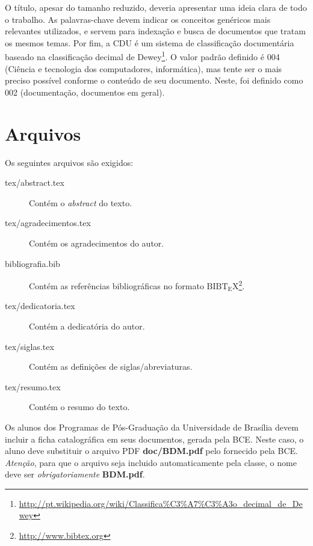 O título, apesar do tamanho reduzido, deveria apresentar uma ideia clara de todo
o trabalho. As palavras-chave devem indicar os conceitos genéricos mais relevantes
utilizados, e servem para indexação e busca de documentos que tratam os mesmos
temas.  Por fim, a \acrfull{CDU} é um sistema de classificação documentária
baseado na classificação decimal de Dewey\footnote{\url{http://pt.wikipedia.org/wiki/Classifica\%C3\%A7\%C3\%A3o_decimal_de_Dewey}}.
O valor padrão definido é 004 (Ciência e tecnologia dos computadores, informática),
mas tente ser o mais preciso possível conforme o conteúdo de seu documento. Neste,
foi definido como 002 (documentação, documentos em geral).


\section{Arquivos}
Os seguintes arquivos são exigidos:
\begin{description}%
    \item[tex/abstract.tex] Contém o \emph{abstract} do texto.%
    \item[tex/agradecimentos.tex] Contém os agradecimentos do autor.%
    \item[bibliografia.bib] Contém as referências bibliográficas no formato
    ${\mathrm{B{\scriptstyle{IB}}T_{\displaystyle E}X}}$\footnote{\url{http://www.bibtex.org}}.%
    \item[tex/dedicatoria.tex] Contém a dedicatória do autor.%
    \item[tex/siglas.tex] Contém as definições de siglas/abreviaturas.%
    \item[tex/resumo.tex] Contém o resumo do texto.%
\end{description}%

Os alunos dos Programas de Pós-Graduação da Universidade de Brasília devem incluir a ficha catalográfica em seus documentos, gerada pela \acrfull{BCE}. Neste caso, o aluno deve substituir o arquivo PDF \textbf{doc/BDM.pdf} pelo fornecido pela \acrshort{BCE}. \emph{Atenção}, para que o arquivo seja incluido automaticamente pela classe, o nome deve ser \emph{obrigatoriamente} \textbf{BDM.pdf}.%

